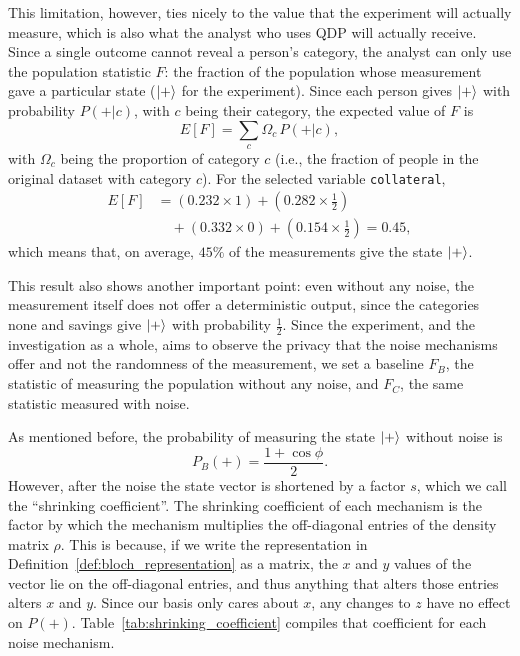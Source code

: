 \documentclass{ieeeaccess}
\begin{document}
This limitation, however, ties nicely to the value that the experiment will actually measure, which is also what the analyst who uses QDP will actually receive. Since a single outcome cannot reveal a person's category, the analyst can only use the population statistic $F$: the fraction of the population whose measurement gave a particular state ($\ket{+}$ for the experiment). Since each person gives $\ket{+}$ with probability $P(+|c)$, with $c$ being their category, the expected value of $F$ is
\begin{equation}
  E[F] = \sum_{c} \Omega_c \, P(+|c),
  \label{eq:expected_F}
\end{equation}
with $\Omega_c$ being the proportion of category $c$ (i.e., the fraction of people in the original dataset with category $c$). For the selected variable \texttt{collateral},
\begin{align}
  E[F] &= (0.232 \times 1) + \left(0.282 \times \tfrac{1}{2}\right) \nonumber \\
       &\quad + (0.332 \times 0) + \left(0.154 \times \tfrac{1}{2}\right) = 0.45,
  \label{eq:expected_F_collateral}
\end{align}
which means that, on average, $45\%$ of the measurements give the state $\ket{+}$.

This result also shows another important point: even without any noise, the measurement itself does not offer a deterministic output, since the categories none and savings give $\ket{+}$ with probability $\frac{1}{2}$. Since the experiment, and the investigation as a whole, aims to observe the privacy that the noise mechanisms offer and not the randomness of the measurement, we set a baseline $F_B$, the statistic of measuring the population without any noise, and $F_C$, the same statistic measured with noise.

As mentioned before, the probability of measuring the state $\ket{+}$ without noise is
\begin{equation}
  P_B(+) = \frac{1+\cos\phi}{2}.
  \label{eq:p_b}
\end{equation}
However, after the noise the state vector is shortened by a factor $s$, which we call the ``shrinking coefficient''. The shrinking coefficient of each mechanism is the factor by which the mechanism multiplies the off-diagonal entries of the density matrix $\rho$. This is because, if we write the representation in Definition~\ref{def:bloch_representation} as a matrix, the $x$ and $y$ values of the vector lie on the off-diagonal entries, and thus anything that alters those entries alters $x$ and $y$. Since our basis only cares about $x$, any changes to $z$ have no effect on $P(+)$. Table~\ref{tab:shrinking_coefficient} compiles that coefficient for each noise mechanism.
\end{document}
